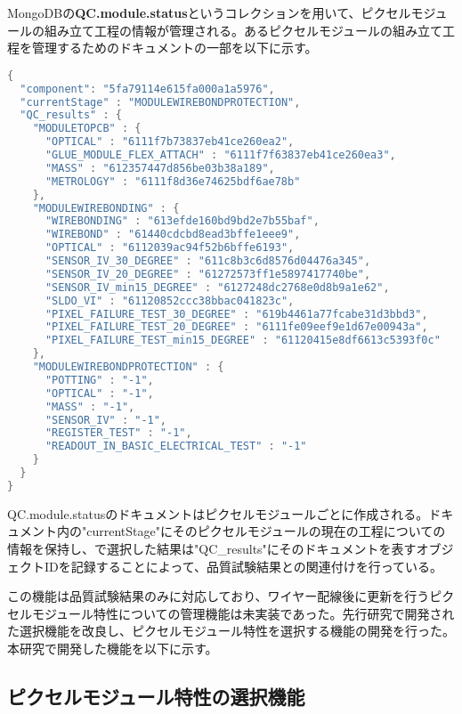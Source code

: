 MongoDBの\textbf{QC.module.status}というコレクションを用いて、ピクセルモジュールの組み立て工程の情報が管理される。あるピクセルモジュールの組み立て工程を管理するためのドキュメントの一部を以下に示す。
\begin{lstlisting}[caption=ピクセルモジュールの組み立て工程を管理するためのドキュメントの一部。,label=fuga, language=C++]
{
  "component": "5fa79114e615fa000a1a5976",
  "currentStage" : "MODULEWIREBONDPROTECTION",
  "QC_results" : {
    "MODULETOPCB" : {
      "OPTICAL" : "6111f7b73837eb41ce260ea2",
      "GLUE_MODULE_FLEX_ATTACH" : "6111f7f63837eb41ce260ea3",
      "MASS" : "612357447d856be03b38a189",
      "METROLOGY" : "6111f8d36e74625bdf6ae78b"
    },
    "MODULEWIREBONDING" : {
      "WIREBONDING" : "613efde160bd9bd2e7b55baf",
      "WIREBOND" : "61440cdcbd8ead3bffe1eee9",
      "OPTICAL" : "6112039ac94f52b6bffe6193",
      "SENSOR_IV_30_DEGREE" : "611c8b3c6d8576d04476a345",
      "SENSOR_IV_20_DEGREE" : "61272573ff1e5897417740be",
      "SENSOR_IV_min15_DEGREE" : "6127248dc2768e0d8b9a1e62",
      "SLDO_VI" : "61120852ccc38bbac041823c",
      "PIXEL_FAILURE_TEST_30_DEGREE" : "619b4461a77fcabe31d3bbd3",
      "PIXEL_FAILURE_TEST_20_DEGREE" : "6111fe09eef9e1d67e00943a",
      "PIXEL_FAILURE_TEST_min15_DEGREE" : "61120415e8df6613c5393f0c"
    },
    "MODULEWIREBONDPROTECTION" : {
      "POTTING" : "-1",
      "OPTICAL" : "-1",
      "MASS" : "-1",
      "SENSOR_IV" : "-1",
      "REGISTER_TEST" : "-1",
      "READOUT_IN_BASIC_ELECTRICAL_TEST" : "-1"
    }
  }
}
\end{lstlisting}

QC.module.statusのドキュメントはピクセルモジュールごとに作成される。ドキュメント内の"currentStage"にそのピクセルモジュールの現在の工程についての情報を保持し、で選択した結果は"QC\_results"にそのドキュメントを表すオブジェクトIDを記録することによって、品質試験結果との関連付けを行っている。

この機能は品質試験結果のみに対応しており、ワイヤー配線後に更新を行うピクセルモジュール特性についての管理機能は未実装であった。先行研究で開発された選択機能を改良し、ピクセルモジュール特性を選択する機能の開発を行った。
本研究で開発した機能を以下に示す。

\subsection{ピクセルモジュール特性の選択機能}
\label{sec:prop-sentaku}

